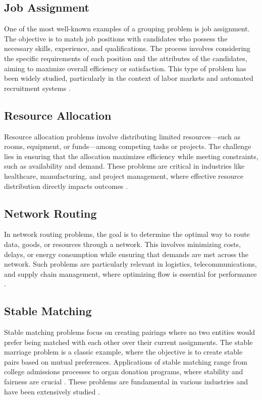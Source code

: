     \subsection{Job Assignment} \label{subsec:job_assignment}
        One of the most well-known examples of a grouping problem is job assignment. The objective is to match job positions with candidates who possess the necessary skills, experience, and qualifications. The process involves considering the specific requirements of each position and the attributes of the candidates, aiming to maximize overall efficiency or satisfaction. This type of problem has been widely studied, particularly in the context of labor markets and automated recruitment systems \cite{roth1990two}.

    \subsection{Resource Allocation} \label{subsec:resource_allocation}
        Resource allocation problems involve distributing limited resources—such as rooms, equipment, or funds—among competing tasks or projects. The challenge lies in ensuring that the allocation maximizes efficiency while meeting constraints, such as availability and demand. These problems are critical in industries like healthcare, manufacturing, and project management, where effective resource distribution directly impacts outcomes \cite{schrijver2003combinatorial}.
    
    \subsection{Network Routing} \label{subsec:network_routing}
        In network routing problems, the goal is to determine the optimal way to route data, goods, or resources through a network. This involves minimizing costs, delays, or energy consumption while ensuring that demands are met across the network. Such problems are particularly relevant in logistics, telecommunications, and supply chain management, where optimizing flow is essential for performance \cite{ahuja1993network}.
    
    \subsection{Stable Matching} \label{subsec:stable_matching}
        Stable matching problems focus on creating pairings where no two entities would prefer being matched with each other over their current assignments.
        The stable marriage problem is a classic example, where the objective is to create stable pairs based on mutual preferences. Applications of stable matching range from college admissions processes to organ donation programs, where stability and fairness are crucial \cite{gusfield1989stable, demange1986multi}.
        These problems are fundamental in various industries and have been extensively studied \cite{manlove2013algorithmics}.


